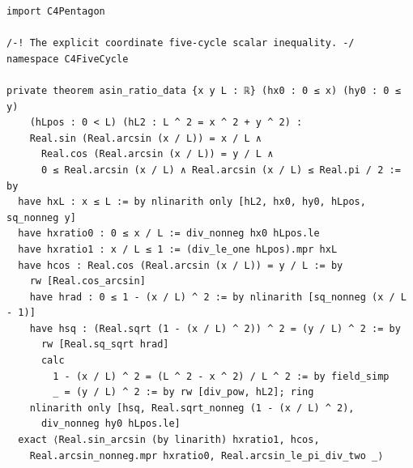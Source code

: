 \documentclass[11pt,a4paper]{article}
\begin{document}
\begin{Verbatim}[breaklines,breakanywhere,fontsize=\footnotesize]
import C4Pentagon

/-! The explicit coordinate five-cycle scalar inequality. -/
namespace C4FiveCycle

private theorem asin_ratio_data {x y L : ℝ} (hx0 : 0 ≤ x) (hy0 : 0 ≤ y)
    (hLpos : 0 < L) (hL2 : L ^ 2 = x ^ 2 + y ^ 2) :
    Real.sin (Real.arcsin (x / L)) = x / L ∧
      Real.cos (Real.arcsin (x / L)) = y / L ∧
      0 ≤ Real.arcsin (x / L) ∧ Real.arcsin (x / L) ≤ Real.pi / 2 := by
  have hxL : x ≤ L := by nlinarith only [hL2, hx0, hy0, hLpos, sq_nonneg y]
  have hxratio0 : 0 ≤ x / L := div_nonneg hx0 hLpos.le
  have hxratio1 : x / L ≤ 1 := (div_le_one hLpos).mpr hxL
  have hcos : Real.cos (Real.arcsin (x / L)) = y / L := by
    rw [Real.cos_arcsin]
    have hrad : 0 ≤ 1 - (x / L) ^ 2 := by nlinarith [sq_nonneg (x / L - 1)]
    have hsq : (Real.sqrt (1 - (x / L) ^ 2)) ^ 2 = (y / L) ^ 2 := by
      rw [Real.sq_sqrt hrad]
      calc
        1 - (x / L) ^ 2 = (L ^ 2 - x ^ 2) / L ^ 2 := by field_simp
        _ = (y / L) ^ 2 := by rw [div_pow, hL2]; ring
    nlinarith only [hsq, Real.sqrt_nonneg (1 - (x / L) ^ 2),
      div_nonneg hy0 hLpos.le]
  exact ⟨Real.sin_arcsin (by linarith) hxratio1, hcos,
    Real.arcsin_nonneg.mpr hxratio0, Real.arcsin_le_pi_div_two _⟩


\end{Verbatim}
\end{document}

